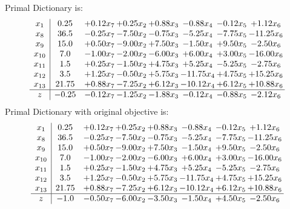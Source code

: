 \documentclass[8pt]{article}
\begin{document}
Primal Dictionary is:
\[\begin{array}{c| c c@{\hskip 2pt} c@{\hskip 2pt} c@{\hskip 2pt} c@{\hskip 2pt} c@{\hskip 2pt} c@{\hskip 2pt} }
 x_{1}   &  0.25 & +  0.12 x_{7} & +  0.25 x_{2} & +  0.88 x_{3} & -0.88 x_{4} & -0.12 x_{5} & +  1.12 x_{6}\\
 x_{8}   &  36.5 & -0.25 x_{7} & -7.50 x_{2} & -0.75 x_{3} & -5.25 x_{4} & -7.75 x_{5} & -11.25 x_{6}\\
 x_{9}   &  15.0 & +  0.50 x_{7} & -9.00 x_{2} & +  7.50 x_{3} & -1.50 x_{4} & +  9.50 x_{5} & -2.50 x_{6}\\
 x_{10}   &  7.0 & -1.00 x_{7} & -2.00 x_{2} & -6.00 x_{3} & +  6.00 x_{4} & +  3.00 x_{5} & -16.00 x_{6}\\
 x_{11}   &  1.5 & +  0.25 x_{7} & -1.50 x_{2} & +  4.75 x_{3} & +  5.25 x_{4} & -5.25 x_{5} & -2.75 x_{6}\\
 x_{12}   &  3.5 & +  1.25 x_{7} & -0.50 x_{2} & +  5.75 x_{3} & -11.75 x_{4} & +  4.75 x_{5} & + 15.25 x_{6}\\
 x_{13}   &  21.75 & +  0.88 x_{7} & -7.25 x_{2} & +  6.12 x_{3} & -10.12 x_{4} & +  6.12 x_{5} & + 10.88 x_{6}\\
\hline
z    &  -0.25 & -0.12 x_{7} & -1.25 x_{2} & -1.88 x_{3} & -0.12 x_{4} & -0.88 x_{5} & -2.12 x_{6}\\
\end{array}\]
Primal Dictionary with original objective is:
\[\begin{array}{c| c c@{\hskip 2pt} c@{\hskip 2pt} c@{\hskip 2pt} c@{\hskip 2pt} c@{\hskip 2pt} c@{\hskip 2pt} }
 x_{1}   &  0.25 & +  0.12 x_{7} & +  0.25 x_{2} & +  0.88 x_{3} & -0.88 x_{4} & -0.12 x_{5} & +  1.12 x_{6}\\
 x_{8}   &  36.5 & -0.25 x_{7} & -7.50 x_{2} & -0.75 x_{3} & -5.25 x_{4} & -7.75 x_{5} & -11.25 x_{6}\\
 x_{9}   &  15.0 & +  0.50 x_{7} & -9.00 x_{2} & +  7.50 x_{3} & -1.50 x_{4} & +  9.50 x_{5} & -2.50 x_{6}\\
 x_{10}   &  7.0 & -1.00 x_{7} & -2.00 x_{2} & -6.00 x_{3} & +  6.00 x_{4} & +  3.00 x_{5} & -16.00 x_{6}\\
 x_{11}   &  1.5 & +  0.25 x_{7} & -1.50 x_{2} & +  4.75 x_{3} & +  5.25 x_{4} & -5.25 x_{5} & -2.75 x_{6}\\
 x_{12}   &  3.5 & +  1.25 x_{7} & -0.50 x_{2} & +  5.75 x_{3} & -11.75 x_{4} & +  4.75 x_{5} & + 15.25 x_{6}\\
 x_{13}   &  21.75 & +  0.88 x_{7} & -7.25 x_{2} & +  6.12 x_{3} & -10.12 x_{4} & +  6.12 x_{5} & + 10.88 x_{6}\\
\hline
z    &  -1.0 & -0.50 x_{7} & -6.00 x_{2} & -3.50 x_{3} & -1.50 x_{4} & +  4.50 x_{5} & -2.50 x_{6}\\
\end{array}\]
\end{document}
